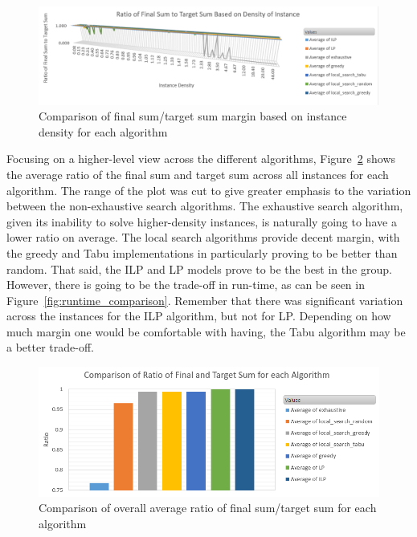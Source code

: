\documentclass{report}
\begin{document}
\begin{figure}[h]
  \centering
  \includegraphics[width=16cm]{margin_density_comparison.png}
  \caption{Comparison of final sum/target sum margin based on instance density for each algorithm}
  \label{fig:margin_comparison}
\end{figure}

Focusing on a higher-level view across the different algorithms, Figure~\ref{fig:overall_margin_comparison} shows the average ratio
of the final sum and target sum across all instances for each algorithm. The range of the plot was cut to give greater emphasis to the
variation between the non-exhaustive search algorithms. The exhaustive search algorithm, given its inability to solve higher-density
instances, is naturally going to have a lower ratio on average. The local search algorithms provide decent margin, with the greedy
and Tabu implementations in particularly proving to be better than random. That said, the ILP and LP models prove to be the best in the
group. However, there is going to be the trade-off in run-time, as can be seen in Figure~\ref{fig:runtime_comparison}. Remember
that there was significant variation across the instances for the ILP algorithm, but not for LP. Depending on how much margin one
would be comfortable with having, the Tabu algorithm may be a better trade-off. 

\begin{figure}[h]
  \centering
  \includegraphics[width=12cm]{margin_comparison_plot.png}
  \caption{Comparison of overall average ratio of final sum/target sum for each algorithm}
  \label{fig:overall_margin_comparison}
\end{figure}
\end{document}
